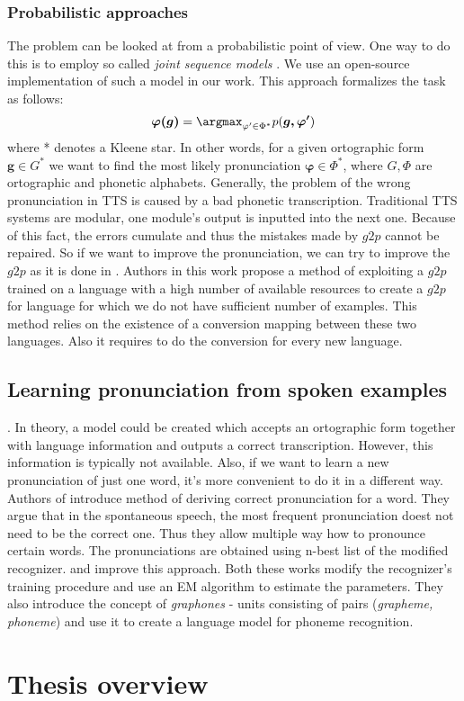 \subsubsection{Probabilistic approaches}
The problem can be looked at from a probabilistic point of view. One way to do this is to employ so called \textit{joint sequence models} \cite{bisani2008joint}. We use an open-source implementation of such a model in our work. This approach formalizes the task as follows:
\begin{equation}
\boldsymbol{\varphi(g)} = \argmax_{\varphi'\in\Phi^*} p(\boldsymbol{g,\varphi'})
\end{equation}
where * denotes a Kleene star. In other words, for a given ortographic form $\boldsymbol{g} \in G^*$ we want to find the most likely pronunciation $\boldsymbol{\varphi} \in \Phi^*$, where $G, \Phi$ are ortographic and phonetic alphabets.
\linebreak \linebreak
Generally, the problem of the wrong pronunciation in TTS  is caused by a bad phonetic transcription.
Traditional TTS systems are modular, one module's output is inputted into the next one.
Because of this fact, the errors cumulate and thus the mistakes made by $g2p$ cannot be repaired.
So if we want to improve the pronunciation, we can try to improve the $g2p$ as it is done in \cite{deri2016grapheme}.
Authors in this work propose a method of exploiting a $g2p$ trained on a language with a high number of available resources to create a $g2p$ for language for which we do not have sufficient number of examples.
This method relies on the existence of a conversion mapping between these two languages.
Also it requires to do the conversion for every new language.
\subsection{Learning pronunciation from spoken examples}. 
In theory, a model could be created which accepts an ortographic form together with language information and outputs a correct transcription.
However, this information is typically not available.
Also, if we want to learn a new pronunciation of just one word, it's more convenient to do it in a different way.
Authors of \cite{slobada1996dictionary} introduce method of deriving correct pronunciation for a word.
They argue that in the spontaneous speech, the most frequent pronunciation doest not need to be the correct one.
Thus they allow multiple way how to pronounce certain words.
The pronunciations are obtained using n-best list of the modified recognizer.
\cite{mcgraw2013learning} and \cite{reddy2011learning} improve this approach.
Both these works modify the recognizer's training procedure and use an EM algorithm to estimate the parameters.
They also introduce the concept of \textit{graphones} - units consisting of pairs (\textit{grapheme, phoneme}) and use it to create a language model for phoneme recognition.

\section{Thesis overview}
